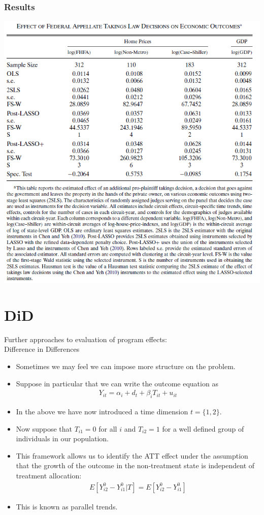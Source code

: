 \begin{frame}
  \frametitle{Results}
  \vspace{-10pt}
  \begin{center}
    \includegraphics[width=1\textwidth]{./resources/belloniTakingsResults}
  \end{center}  
\end{frame}


\section{DiD}
\begin{frame}{Further approaches to evaluation of program effects: \\
{\small Difference in Differences } }
\begin{itemize}
\item Sometimes we may feel we can impose more structure on the problem.
\item Suppose in particular that we can write the outcome equation as
\begin{align*}
 Y_{it} =\alpha_i +d_t +\beta_i T_{it} +u_{it}
 \end{align*}
\item In the above we have now introduced a time dimension $t=\{1,2\}$. 
\item Now suppose that $T_{i1}=0$ for all $i$ and $T_{i2}=1$ for a well defined group of individuals in our population.
\item This framework allows us to identify the ATT effect under the assumption that the growth of the outcome in the non-treatment state is independent of treatment allocation:
\begin{align*}
E[Y_{i2}^0 - Y_{i1}^0 | T] = E[Y_{i2}^0 - Y_{i1}^0] 
\end{align*}
\item This is known as \alert{parallel trends}.
\end{itemize}
\end{frame}

